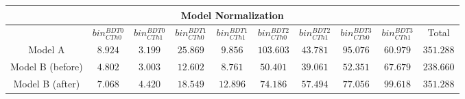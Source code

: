 \begin{table}
\begin{tabular}{|c||c|c|c|c|c|c|c|c|c|}
\hline
\multicolumn{10}{|c|}{Model Normalization} \\ 
\hline
 & $bin^{BDT 0}_{CTh 0}$ & $bin^{BDT 0}_{CTh 1}$ & $bin^{BDT 1}_{CTh 0}$ & $bin^{BDT 1}_{CTh 1}$ & $bin^{BDT 2}_{CTh 0}$ & $bin^{BDT 2}_{CTh 1}$ & $bin^{BDT 3}_{CTh 0}$ & $bin^{BDT 3}_{CTh 1}$ & Total \\ 
\hline
\hline
Model A &$   8.924$ & $   3.199$ & $  25.869$ & $   9.856$ & $ 103.603$ & $  43.781$ & $  95.076$ & $  60.979$ & $ 351.288$ \\
Model B (before) &$   4.802$ & $   3.003$ & $  12.602$ & $   8.761$ & $  50.401$ & $  39.061$ & $  52.351$ & $  67.679$ & $ 238.660$ \\
Model B (after) &$   7.068$ & $   4.420$ & $  18.549$ & $  12.896$ & $  74.186$ & $  57.494$ & $  77.056$ & $  99.618$ & $ 351.288$ \\
\hline
\end{tabular}
\end{table}
